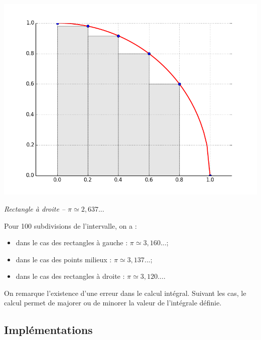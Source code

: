 \documentclass[10pt]{article}
\begin{document}
\begin{minipage}[c]{.32\linewidth}
\begin{center}
\includegraphics[width=.99\textwidth]{images/CourbesPython/pi_rect_d}

\textit{Rectangle à droite -- $\pi \simeq 2,637...$}
\end{center}
\end{minipage}

Pour 100 subdivisions de l'intervalle, on a :
\begin{itemize}
\item dans le cas des rectangles à gauche : $\pi\simeq 3,160...$;
\item dans le cas des points milieux : $\pi\simeq 3,137...$;
\item dans le cas des rectangles à droite : $\pi\simeq 3,120...$.
\end{itemize}


\begin{rem}
On remarque l'existence d'une erreur dans le calcul intégral. Suivant les cas, le calcul permet de majorer ou de minorer la valeur de l'intégrale définie. 
\end{rem}



\subsection{Implémentations}
\end{document}
